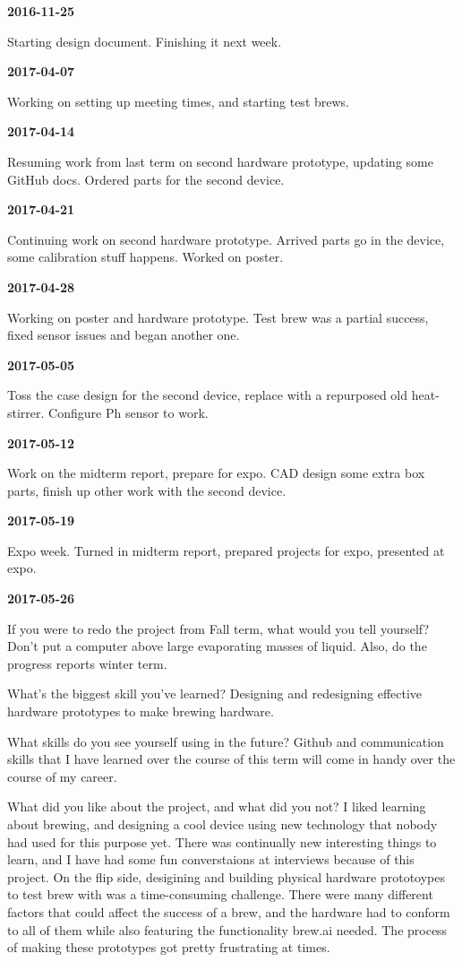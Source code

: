 \textbf{2016-11-25} 

Starting design document. Finishing it next week.

\textbf{2017-04-07} 

Working on setting up meeting times, and starting test brews.

\textbf{2017-04-14} 

Resuming work from last term on second hardware prototype, updating some GitHub docs. Ordered parts for the second device.

\textbf{2017-04-21} 

Continuing work on second hardware prototype. Arrived parts go in the device, some calibration stuff happens. Worked on poster.

\textbf{2017-04-28} 

Working on poster and hardware prototype. Test brew was a partial success, fixed sensor issues and began another one.


\textbf{2017-05-05} 

Toss the case design for the second device, replace with a repurposed old heat-stirrer. Configure Ph sensor to work.

\textbf{2017-05-12} 

Work on the midterm report, prepare for expo. CAD design some extra box parts, finish up other work with the second device.

\textbf{2017-05-19} 

Expo week. Turned in midterm report, prepared projects for expo, presented at expo.

\textbf{2017-05-26} 

 If you were to redo the project from Fall term, what would you tell yourself?
Don't put a computer above large evaporating masses of liquid. Also, do the progress reports winter term.

 What's the biggest skill you've learned?
Designing and redesigning effective hardware prototypes to make brewing hardware.

 What skills do you see yourself using in the future?
Github and communication skills that I have learned over the course of this term will come in handy over the course of my career.

 What did you like about the project, and what did you not?
I liked learning about brewing, and designing a cool device using new technology that nobody had used for this purpose yet. There was continually new interesting things to learn, and I have had some fun converstaions at interviews because of this project. On the flip side, desigining and building physical hardware prototoypes to test brew with was a time-consuming challenge. There were many different factors that could affect the success of a brew, and the hardware had to conform to all of them while also featuring the functionality brew.ai needed. The process of making these prototypes got pretty frustrating at times.

